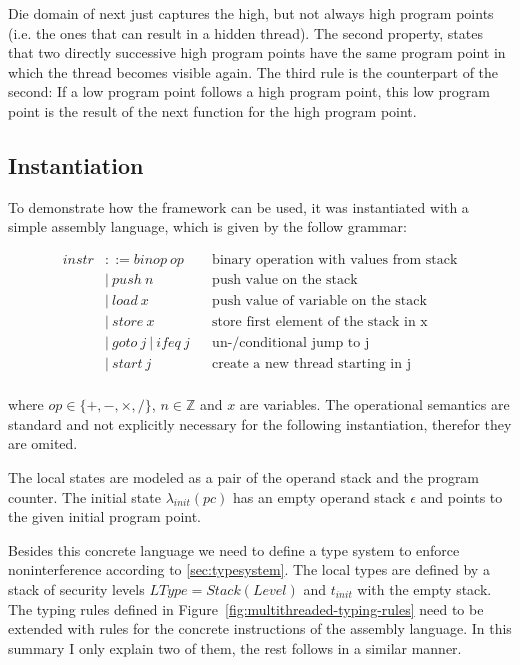 \documentclass[a4paper,10pt]{llncs}
\begin{document}
Die domain of next just captures the high, but not always high program points (i.e. the ones
that can result in a hidden thread). The second property, states that two directly successive high
program points have the same program point in which the thread becomes visible again. The third rule
is the counterpart of the second: If a low program point follows a high program point, this low program
point is the result of the next function for the high program point.


\subsection{Instantiation}
\label{sec:instantiation}
To demonstrate how the framework can be used, it was instantiated with a simple
assembly language, which is given by the follow grammar:

\begin{align*}
instr &::= binop\ op && \text{binary operation with values from stack} \\
&|\ push\ n &&  \text{push value on the stack} \\
&|\ load\ x && \text{push value of variable on the stack} \\
&|\ store\ x && \text{store first element of the stack in x} \\
&|\ goto\ j\ |\ ifeq\ j && \text{un-/conditional jump to j} \\
&|\ start\ j && \text{create a new thread starting in j} \\
\end{align*}

where $op \in \{+,-,\times,/\}$, $n \in \mathbb{Z}$ and $x$ are variables. The
operational semantics are standard and not explicitly necessary for the following
instantiation, therefor they are omited.

The local states are modeled as a pair of the operand stack and the program counter. The
initial state $\lambda_{init}(pc)$ has an empty operand stack $\epsilon$ and points to
the given initial program point.

Besides this concrete language we need to define a type system to enforce noninterference
according to \ref{sec:typesystem}. The local types are defined by a stack of security levels
$LType = Stack(Level)$ and $t_{init}$ with the empty stack. The typing rules defined in
Figure~\ref{fig:multithreaded-typing-rules} need to be extended with rules for the concrete instructions
of the assembly language. In this summary I only explain two of them, the rest follows
in a similar manner.
\end{document}
